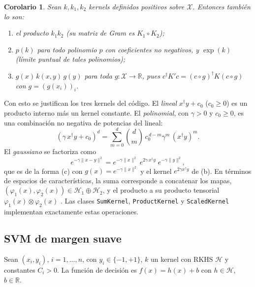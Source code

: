 \documentclass[11pt,a4paper]{article}
\newcommand{\R}{\mathbb{R}}
\newcommand{\X}{\mathcal{X}}
\newcommand{\Hk}{\mathcal{H}}
\newcommand{\dg}{\dagger}                         %
\newcommand{\norm}[1]{\lVert #1\rVert}
\newcommand{\code}[1]{\texttt{#1}}
\theoremstyle{plain}
\newtheorem{corolario}[teorema]{Corolario}
\theoremstyle{definition}
\theoremstyle{remark}
\numberwithin{equation}{section}
\begin{document}
\begin{corolario}\label{cor:producto}
Sean $k,k_1,k_2$ kernels definidos positivos sobre $\X$. Entonces también lo son:
\begin{enumerate}[label=(\alph*)]
  \item el producto $k_1k_2$ (su matriz de Gram es $K_1\circ K_2$);
  \item $p(k)$ para todo polinomio $p$ con coeficientes no negativos, y $\exp(k)$ (límite
        puntual de tales polinomios);
  \item $g(x)\,k(x,y)\,g(y)$ para toda $g\colon\X\to\R$, pues
        $c^{\dg}K'c=(c\circ g)^{\dg}K(c\circ g)$ con $g=(g(x_i))_i$.
\end{enumerate}
\end{corolario}

Con esto se justifican los tres kernels del código. El \emph{lineal} $x^{\dg}y+c_0$
($c_0\ge0$) es un producto interno más un kernel constante. El \emph{polinomial}, con
$\gamma>0$ y $c_0\ge0$, es una combinación no negativa de potencias del lineal:
\begin{equation}\label{eq:poly-expansion}
  (\gamma\,x^{\dg}y+c_0)^d=\sum_{m=0}^d\binom dm\,c_0^{\,d-m}\gamma^m\,(x^{\dg}y)^m .
\end{equation}
El \emph{gaussiano} se factoriza como
\begin{equation}\label{eq:rbf-factorization}
  e^{-\gamma\norm{x-y}^2}=e^{-\gamma\norm{x}^2}\;e^{2\gamma\,x^{\dg}y}\;e^{-\gamma\norm{y}^2},
\end{equation}
que es de la forma (c) con $g(x)=e^{-\gamma\norm x^2}$ y el kernel $e^{2\gamma x^{\dg}y}$ de (b).
En términos de espacios de características, la suma corresponde a concatenar los mapas,
$(\varphi_1(x),\varphi_2(x))\in\Hk_1\oplus\Hk_2$, y el producto a su producto tensorial
$\varphi_1(x)\otimes\varphi_2(x)$ \cite{shawetaylor2004}. Las clases \code{SumKernel},
\code{ProductKernel} y \code{ScaledKernel} implementan exactamente estas operaciones.

\subsection{SVM de margen suave}\label{sec:svm}

Sean $(x_i,y_i)$, $i=1,\dots,n$, con $y_i\in\{-1,+1\}$, $k$ un kernel con RKHS $\Hk$ y
constantes $C_i>0$. La función de decisión es $f(x)=h(x)+b$ con $h\in\Hk$, $b\in\R$.
\end{document}
